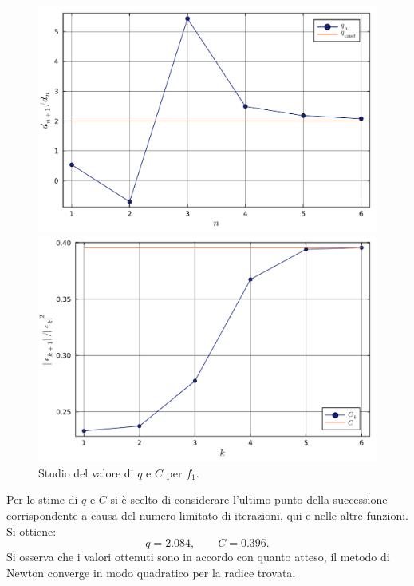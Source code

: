 \documentclass[letterpaper, 12pt]{article}
\numberwithin{equation}{section}    %
\begin{document}
\begin{figure}[!ht]
    \centering
    \begin{minipage}[b]{0.47\textwidth}
        \includegraphics[width=\textwidth]{3321_q.pdf}
    \end{minipage}
    \hspace{0.5cm}
    \begin{minipage}[b]{0.47\textwidth}
        \includegraphics[width=\textwidth]{3321_C.pdf}
    \end{minipage}
    \caption{Studio del valore di $q$ e $C$ per $f_1$.}
    \label{fig:es3_3_2_2}
\end{figure}

Per le stime di $q$ e $C$ si è scelto di considerare l'ultimo punto della successione corrispondente a causa
del numero limitato di iterazioni, qui e nelle altre funzioni. Si ottiene:
\begin{equation*}
    q = 2.084,
    \qquad
    C = 0.396.
\end{equation*}
Si osserva che i valori ottenuti sono in accordo con quanto atteso, il metodo di
Newton converge in modo quadratico per la radice trovata.
\end{document}
